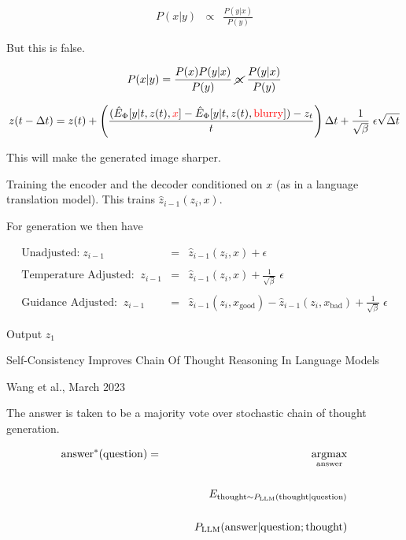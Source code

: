 {\vfill
{\huge \begin{eqnarray*}
P(x|y) & \propto & \frac{P(y|x)}{P(y)}
\end{eqnarray*}}

\vfill
But this is false.

\vfill
{\huge $$P(x|y) = \frac{P(x)P(y|x)}{P(y)} \;\cancel{\propto}\;\frac{P(y|x)}{P(y)}$$}


{\huge $$z(t - \Delta t) = z(t) + \left(\frac{(\hat{E}_\Phi[y|t,z(t),{\color{red} x}] - \hat{E}_\Phi[y|t,z(t),{\color{red} \mathrm{blurry}}]) - z_t}{t}\right)\Delta t
+ \frac{1}{\sqrt{\beta}}\;\epsilon\sqrt{\Delta t}$$}

\vfill
This will make the generated image sharper.


Training the encoder and the decoder conditioned on $x$ (as in a language translation model).
This trains $\hat{z}_{i-1}(z_i,x)$.

\vfill
For generation we then have

{\huge
\begin{eqnarray*}
\mbox{Unadjusted:} \;z_{i-1} & = & \hat{z}_{i-1}(z_i,x) + \epsilon \\
\\
\mbox{Temperature Adjusted:}\;\;z_{i-1} & = & \hat{z}_{i-1}(z_i,x) + \frac{1}{\sqrt{\beta}}\;\epsilon \\
\\
\mbox{Guidance Adjusted:} \;\;z_{i-1} & = & \hat{z}_{i-1}(z_i,x_\mathrm{good}) - \hat{z}_{i-1}(z_i,x_\mathrm{bad}) + \frac{1}{\sqrt{\beta}}\;\epsilon
\end{eqnarray*}
}

\vfill
Output $z_1$

\newcommand{\answer}{\mathrm{answer}}
\newcommand{\thought}{\mathrm{thought}}
\newcommand{\question}{\mathrm{question}}
\newcommand{\LLM}{\mathrm{LLM}}

{\huge
\centerline{Self-Consistency Improves Chain Of Thought Reasoning In Language Models}
\centerline{Wang et al., March 2023}
}
\vfill
The answer is taken to be a majority vote over stochastic chain of thought generation.

\begin{eqnarray*}
\answer^*(\question) 
& = & \argmax_{\answer}\\
\\
& & \;\;\;\;E_{\thought \sim P_{\LLM}({\thought|\question})} \\
\\
& & \;\;\;\;\;\;\;\;P_\LLM(\answer|\question;\thought)
\end{eqnarray*}


}


